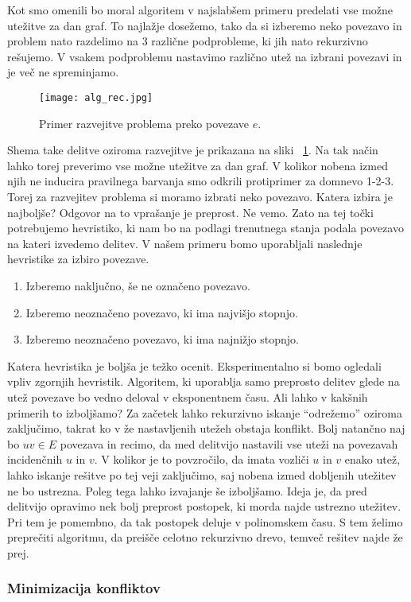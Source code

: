 \documentclass[12pt,a4paper,twoside]{article}
\theoremstyle{definition} %
\theoremstyle{plain} %
\numberwithin{equation}{section}  %
\begin{document}
Kot smo omenili bo moral algoritem v najslabšem primeru predelati vse možne utežitve za dan graf. To najlažje dosežemo, tako da si izberemo neko povezavo in problem nato razdelimo na $3$ različne podprobleme, ki jih nato rekurzivno rešujemo. V vsakem podproblemu nastavimo različno utež na izbrani povezavi in je več ne spreminjamo.
 \begin{figure}[h!]
\caption{Primer razvejitve problema preko povezave $e$.}
\label{alg_rec}
\centering
    \texttt{[image: alg\_rec.jpg]}
    \end{figure}
Shema take delitve oziroma razvejitve je prikazana na sliki ~\ref{alg_rec}. Na tak način lahko torej preverimo vse možne utežitve za dan graf. V kolikor nobena izmed njih ne inducira pravilnega barvanja smo odkrili protiprimer za domnevo 1-2-3. Torej za razvejitev problema si moramo izbrati neko povezavo. Katera izbira je najboljše? Odgovor na to vprašanje je preprost. Ne vemo. Zato na tej točki potrebujemo hevristiko, ki nam bo na podlagi trenutnega stanja podala povezavo na kateri izvedemo delitev. V našem primeru bomo uporabljali naslednje hevristike za izbiro povezave.
\begin{enumerate}
\item Izberemo naključno, še ne označeno povezavo.
\item Izberemo neoznačeno povezavo, ki ima najvišjo stopnjo.
\item Izberemo neoznačeno povezavo, ki ima najnižjo stopnjo.
\end{enumerate}
Katera hevristika je boljša je težko ocenit. Eksperimentalno si bomo ogledali vpliv zgornjih hevristik. Algoritem, ki uporablja samo preprosto delitev glede na utež povezave bo vedno deloval v eksponentnem času. Ali lahko v kakšnih primerih to izboljšamo? Za začetek lahko rekurzivno iskanje ``odrežemo'' oziroma zaključimo, takrat ko v že nastavljenih utežeh obstaja konflikt. Bolj natančno naj bo $uv \in E$ povezava in recimo, da med delitvijo nastavili vse uteži na povezavah incidenčnih $u$ in $v$. V kolikor je to povzročilo, da imata vozliči $u$ in $v$ enako utež, lahko iskanje rešitve po tej veji zaključimo, saj nobena izmed dobljenih utežitev ne bo ustrezna. Poleg tega lahko izvajanje še izboljšamo. Ideja je, da pred delitvijo opravimo nek bolj preprost postopek, ki morda najde ustrezno utežitev. Pri tem je pomembno, da tak postopek deluje v polinomskem času. S tem želimo preprečiti algoritmu, da preišče celotno rekurzivno drevo, temveč rešitev najde že prej.

\subsubsection{Minimizacija konfliktov}
\end{document}
